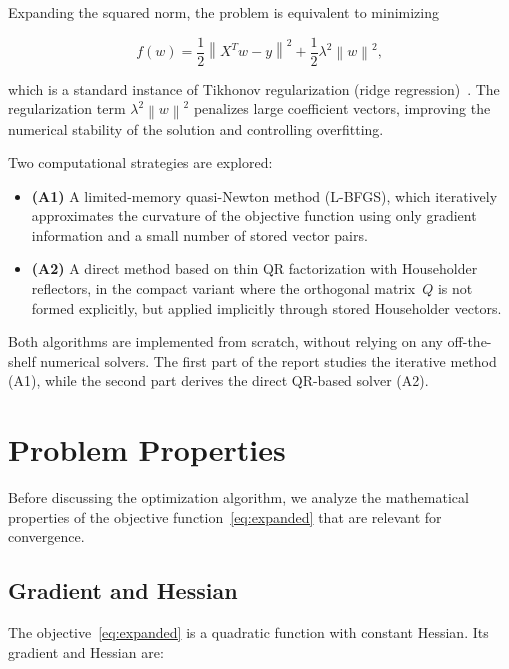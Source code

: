 \documentclass[11pt,a4paper]{article}
\newcommand{\norm}[1]{\left\|#1\right\|}
\begin{document}
Expanding the squared norm, the problem is equivalent to minimizing

\begin{equation}
\label{eq:expanded}
    f(w) = \frac{1}{2}\norm{X^T w - y}^2 + \frac{1}{2}\lambda^2 \norm{w}^2,
\end{equation}

which is a standard instance of Tikhonov regularization (ridge regression)~\cite{hastie2009elements}. 
The regularization term $\lambda^2\norm{w}^2$ penalizes large coefficient vectors, 
improving the numerical stability of the solution and controlling overfitting.

Two computational strategies are explored:

\begin{itemize}[nosep]
    \item \textbf{(A1)} A limited-memory quasi-Newton method (L-BFGS), which iteratively 
    approximates the curvature of the objective function using only gradient information 
    and a small number of stored vector pairs.
    \item \textbf{(A2)} A direct method based on thin QR factorization with Householder 
    reflectors, in the compact variant where the orthogonal matrix~$Q$ is not formed 
    explicitly, but applied implicitly through stored Householder vectors.
\end{itemize}

Both algorithms are implemented from scratch, without relying on any off-the-shelf 
numerical solvers. The first part of the report studies the iterative method (A1), 
while the second part derives the direct QR-based solver (A2).


\section{Problem Properties}
\label{sec:properties}

Before discussing the optimization algorithm, we analyze the mathematical properties 
of the objective function~\eqref{eq:expanded} that are relevant for convergence.

\subsection{Gradient and Hessian}

The objective~\eqref{eq:expanded} is a quadratic function with constant Hessian. 
Its gradient and Hessian are:
\end{document}
